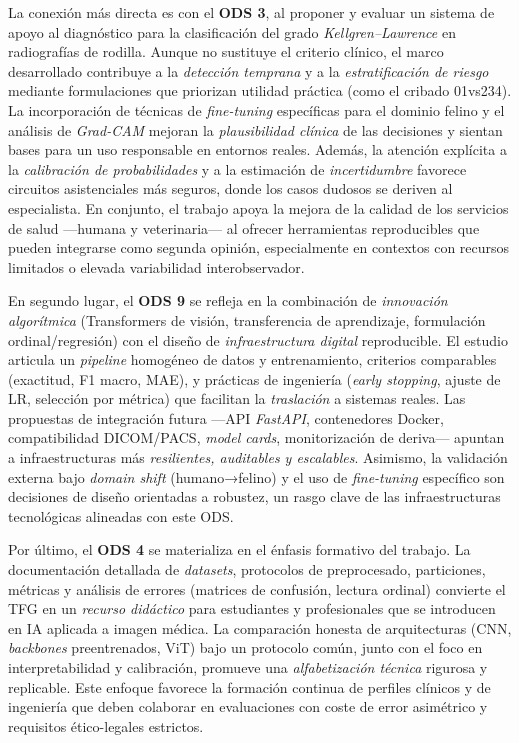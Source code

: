 La conexión más directa es con el \textbf{ODS 3}, al proponer y evaluar un sistema de apoyo al diagnóstico para la clasificación del grado \emph{Kellgren–Lawrence} en radiografías de rodilla. Aunque no sustituye el criterio clínico, el marco desarrollado contribuye a la \emph{detección temprana} y a la \emph{estratificación de riesgo} mediante formulaciones que priorizan utilidad práctica (como el cribado 01vs234). La incorporación de técnicas de \emph{fine-tuning} específicas para el dominio felino y el análisis de \emph{Grad-CAM} mejoran la \emph{plausibilidad clínica} de las decisiones y sientan bases para un uso responsable en entornos reales. Además, la atención explícita a la \emph{calibración de probabilidades} y a la estimación de \emph{incertidumbre} favorece circuitos asistenciales más seguros, donde los casos dudosos se deriven al especialista. En conjunto, el trabajo apoya la mejora de la calidad de los servicios de salud —humana y veterinaria— al ofrecer herramientas reproducibles que pueden integrarse como segunda opinión, especialmente en contextos con recursos limitados o elevada variabilidad interobservador.

En segundo lugar, el \textbf{ODS 9} se refleja en la combinación de \emph{innovación algorítmica} (Transformers de visión, transferencia de aprendizaje, formulación ordinal/regresión) con el diseño de \emph{infraestructura digital} reproducible. El estudio articula un \emph{pipeline} homogéneo de datos y entrenamiento, criterios comparables (exactitud, F1 macro, MAE), y prácticas de ingeniería (\emph{early stopping}, ajuste de LR, selección por métrica) que facilitan la \emph{traslación} a sistemas reales. Las propuestas de integración futura —API \emph{FastAPI}, contenedores Docker, compatibilidad DICOM/PACS, \emph{model cards}, monitorización de deriva— apuntan a infraestructuras más \emph{resilientes, auditables y escalables}. Asimismo, la validación externa bajo \emph{domain shift} (humano→felino) y el uso de \emph{fine-tuning} específico son decisiones de diseño orientadas a robustez, un rasgo clave de las infraestructuras tecnológicas alineadas con este ODS.

Por último, el \textbf{ODS 4} se materializa en el énfasis formativo del trabajo. La documentación detallada de \emph{datasets}, protocolos de preprocesado, particiones, métricas y análisis de errores (matrices de confusión, lectura ordinal) convierte el TFG en un \emph{recurso didáctico} para estudiantes y profesionales que se introducen en IA aplicada a imagen médica. La comparación honesta de arquitecturas (CNN, \emph{backbones} preentrenados, ViT) bajo un protocolo común, junto con el foco en interpretabilidad y calibración, promueve una \emph{alfabetización técnica} rigurosa y replicable. Este enfoque favorece la formación continua de perfiles clínicos y de ingeniería que deben colaborar en evaluaciones con coste de error asimétrico y requisitos ético-legales estrictos.

